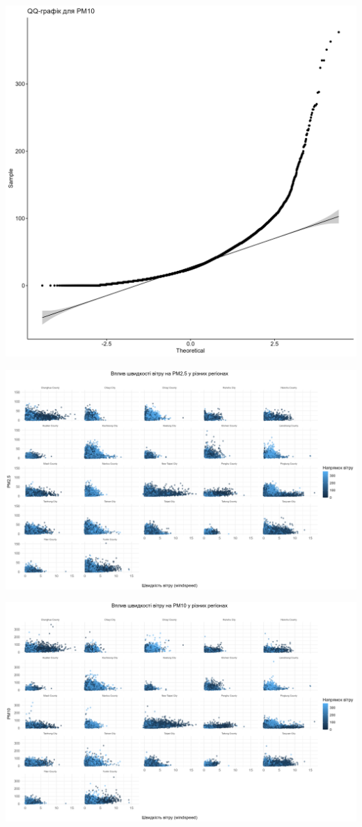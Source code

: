 \documentclass[./report.tex]{subfiles}
\begin{document}
\begin{enumerate}
  \includegraphics[width=\linewidth]{plots/question1/qq_pm10.png}

  \includegraphics[width=\linewidth]{plots/question1/scatter_pm2_5_region.png}

  \includegraphics[width=\linewidth]{plots/question1/scatter_pm10_region.png}


\end{enumerate}
\end{document}
